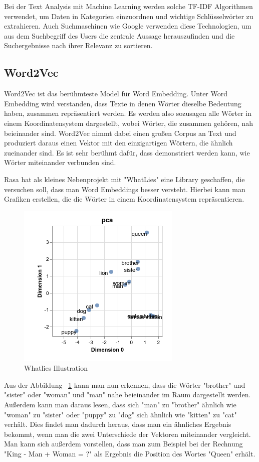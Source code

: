 Bei der Text Analysis mit Machine Learning werden solche TF-IDF Algorithmen verwendet, um Daten in Kategorien einzuordnen und wichtige Schlüsselwörter zu extrahieren.
Auch Suchmaschinen wie Google verwenden diese Technologien, um aus dem Suchbegriff des Users die zentrale Aussage herauszufinden und die Suchergebnisse nach ihrer Relevanz zu sortieren.\cite{tfIdf}

\subsection{Word2Vec}

Word2Vec ist das berühmteste Model für Word Embedding.
Unter Word Embedding wird verstanden, dass Texte in denen Wörter dieselbe Bedeutung haben, zusammen repräsentiert werden.
Es werden also sozusagen alle Wörter in einem Koordinatensystem dargestellt, wobei Wörter, die zusammen gehören, nah beieinander sind.
Word2Vec nimmt dabei einen großen Corpus an Text und produziert daraus einen Vektor mit den einzigartigen Wörtern, die ähnlich zueinander sind.
Es ist sehr berühmt dafür, dass demonstriert werden kann, wie Wörter miteinander verbunden sind.

Rasa hat als kleines Nebenprojekt mit "WhatLies" eine Library geschaffen, die versuchen soll, dass man Word Embeddings besser versteht.
Hierbei kann man Grafiken erstellen, die die Wörter in einem Koordinatensystem repräsentieren.\cite{whatlies}

\begin{figure}[hbt!]
    \centering
    \includegraphics[scale=1]{pics/whatlies_demo}
    \caption{Whatlies Illustration~\cite{whatlies}}
    \label{fig:whatlies-demo}
\end{figure}

Aus der Abbildung ~\ref{fig:whatlies-demo} kann man nun erkennen, dass die Wörter "brother" und "sister" oder "woman" und "man" nahe beieinander im Raum dargestellt werden.
Außerdem kann man daraus lesen, dass sich "man" zu "brother" ähnlich wie "woman" zu "sister" oder "puppy" zu "dog" sich ähnlich wie "kitten" zu "cat" verhält.
Dies findet man dadurch heraus, dass man ein ähnliches Ergebnis bekommt, wenn man die zwei Unterschiede der Vektoren miteinander vergleicht.
Man kann sich außerdem vorstellen, dass man zum Beispiel bei der Rechnung "King - Man + Woman = ?" als Ergebnis die Position des Wortes "Queen" erhält.

